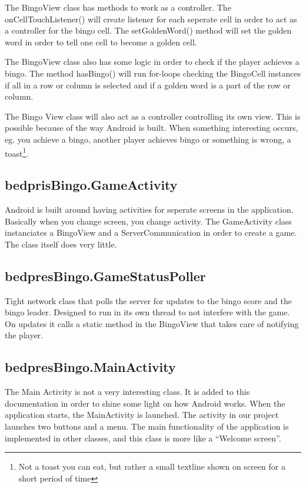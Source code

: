The BingoView class has methods to work as a controller. The onCellTouchListener() will create listener for each seperate cell in order to act as a controller for the bingo cell. The setGoldenWord() method will set the golden word in order to tell one cell to become a golden cell. 

The BingoView class also has some logic in order to check if the player achieves a bingo. The method hasBingo() will run for-loops checking the BingoCell instances if all in a row or column is selected and if a golden word is a part of the row or column.

The Bingo View class will also act as a controller controlling its own view. This is possible because of the way Android is built. When something interesting occurs, eg. you achieve a bingo, another player achieves bingo or something is wrong, a toast\footnote[1]{Not a toast you can eat, but rather a small textline shown on screen for a short period of time}.


\subsection{bedprisBingo.GameActivity}
Android is built around having activities for seperate screens in the application. Basically when you change screen, you change activity. The GameActivity class instanciates a BingoView and a ServerCommunication in order to create a game. The class itself does very little.

\subsection{bedpresBingo.GameStatusPoller}
Tight network class that polls the server for updates to the bingo score and
the bingo leader. Designed to run in its own thread to not interfere with the game.
On updates it calls a static method in the BingoView that takes care of notifying the player.


\subsection{bedpresBingo.MainActivity}
The Main Activity is not a very interesting class. It is added to this documentation in order to shine some light on how Android works. When the application starts, the MainActivity is launched. The activity in our project launches two buttons and a menu. The main functionality of the application is implemented in other classes, and this class is more like a ``Welcome screen''. 


